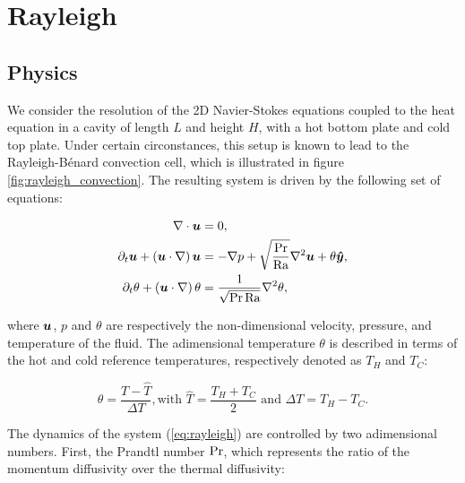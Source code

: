 \chapter{Rayleigh}

\section{Physics}

We consider the resolution of the 2D Navier-Stokes equations coupled to the heat equation in a cavity of length $L$ and height $H$, with a hot bottom plate and cold top plate. Under certain circonstances, this setup is known to lead to the Rayleigh-B\'enard convection cell, which is illustrated in figure \ref{fig:rayleigh_convection}. The resulting system is driven by the following set of equations:

\begin{equation}
\label{eq:rayleigh}
\begin{split}
	\nabla \cdot \bm{u} 						&= 0, \\
	\partial_t \bm{u} + (\bm{u} \cdot \nabla) \, \bm{u} 	&= -\nabla p + \sqrt{\frac{\text{Pr}}{\text{Ra}}} \nabla^2 \bm{u} + \theta \bm{\hat{y}}, \\
	\partial_t \theta + (\bm{u} \cdot \nabla) \, \theta 	&= \frac{1}{\sqrt{\text{Pr} \, \text{Ra}}} \nabla^2 \theta,
\end{split}
\end{equation}

where $\bm{u}$, $p$ and $\theta$ are respectively the non-dimensional velocity, pressure, and temperature  of the fluid. The adimensional temperature $\theta$ is described in terms of the hot and cold reference temperatures, respectively denoted as $T_H$ and $T_C$: 

\begin{equation*}
	\theta = \frac{T - \hat{T}}{\Delta T}, \text{with } \hat{T} = \frac{T_H + T_C}{2} \text{ and } \Delta T = T_H - T_C.
\end{equation*}

The dynamics of the system (\ref{eq:rayleigh}) are controlled by two adimensional numbers. First, the Prandtl number $\text{Pr}$, which represents the ratio of the momentum diffusivity over the thermal diffusivity: 

